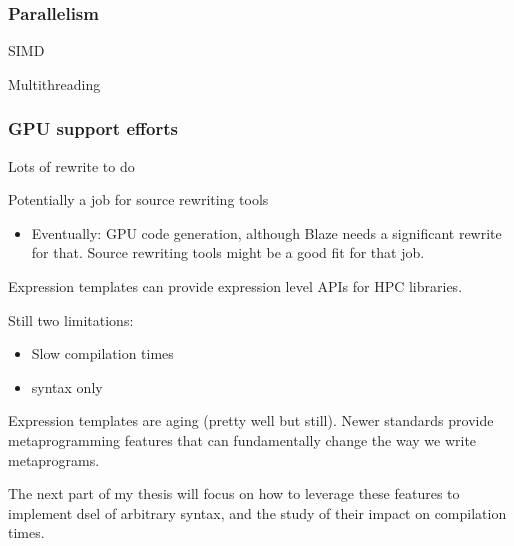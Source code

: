 \documentclass[../main]{subfiles}
\begin{document}
\subsubsection{
  Parallelism
}

SIMD

Multithreading

\subsubsection{
  GPU support efforts
}

Lots of rewrite to do

Potentially a job for source rewriting tools

\begin{itemize}
\item Eventually: GPU code generation, although Blaze needs a significant
      rewrite for that. Source rewriting tools might be a good fit for that job.
\end{itemize}

Expression templates can provide expression level APIs for HPC libraries.

Still two limitations:

\begin{itemize}
\item Slow compilation times
\item \cpp syntax only
\end{itemize}

Expression templates are aging (pretty well but still).
Newer \cpp standards provide metaprogramming features that can fundamentally
change the way we write metaprograms.

The next part of my thesis will focus on how to leverage these features to
implement \gls{dsel} of arbitrary syntax, and the study of their impact on
compilation times.
\end{document}
